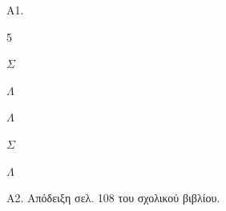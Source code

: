 A1.
\begin{multicols}{5}
\begin{rlist}
\item $\Sigma$
\item $\Lambda$
\item $\Lambda$
\item $\Sigma$
\item $\Lambda$
\end{rlist}
\end{multicols}
A2. Απόδειξη σελ. 108 του σχολικού βιβλίου.


